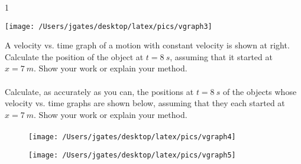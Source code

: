 

\AddToShipoutPicture*{\BackgroundPic}

\addtocounter {ProbNum} {1}

\begin{floatingfigure}[r]{.34\textwidth}
\texttt{[image: /Users/jgates/desktop/latex/pics/vgraph3]}
\end{floatingfigure}
 
{\bf \Large{}} A velocity vs. time graph of a motion with constant velocity is shown at right.  Calculate the position of the object at $t =8~s$, assuming that it started at $x =7~m$. Show your work or explain your method. \paragraph{}
\noindent

\vfill
Calculate, as accurately as you can, the positions at $t =8~s$ of the objects whose velocity vs. time graphs are shown below, assuming that they each started at $x =7~m$. Show your work or explain your method.\paragraph{}
\noindent
\begin{figure}[ht]
\begin{minipage}[b]{0.5\linewidth}
\centering
\texttt{[image: /Users/jgates/desktop/latex/pics/vgraph4]}
\end{minipage}
\hspace{0.5cm}
\begin{minipage}[b]{0.5\linewidth}
\centering
\texttt{[image: /Users/jgates/desktop/latex/pics/vgraph5]}
\end{minipage}
\end{figure}

\vfill
\vfill
\newpage
